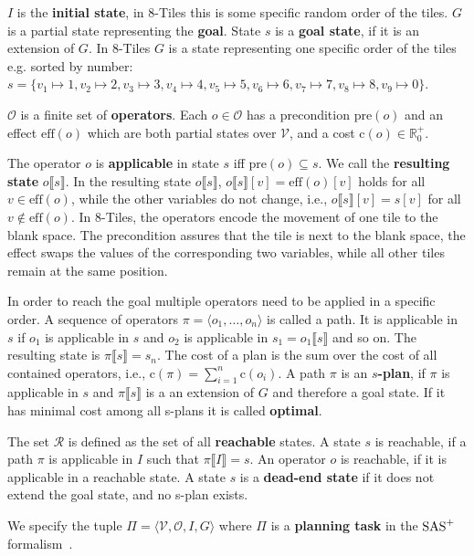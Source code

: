 $I$ is the \textbf{initial state}, in 8-Tiles this is some specific random order of the tiles.
$G$ is a partial state representing the \textbf{goal}.
State $s$ is a \textbf{goal state}, if it is an extension of $G$.
In 8-Tiles $G$ is a state representing one specific order of the tiles e.g. sorted by number:
$s = \{v_1\mapsto1, v_2\mapsto2, v_3\mapsto3, v_4\mapsto4, v_5\mapsto5, v_6\mapsto6, v_7\mapsto7, v_8\mapsto8, v_9\mapsto0\}$.

$\mathcal{O}$ is a finite set of \textbf{operators}.
Each $o\in\mathcal{O}$ has a precondition $\text{pre}(o)$ and an effect $\text{eff}(o)$ which are both partial states over $\mathcal{V}$, and a cost $\text{c}(o)\in\mathbb{R}^+_0$.

The operator $o$ is \textbf{applicable} in state $s$ iff $\text{pre}(o)\subseteq s$.
We call the \textbf{resulting state} $o\llbracket s\rrbracket$.
In the resulting state $o\llbracket s\rrbracket$, $o\llbracket s\rrbracket[v] = \text{eff}(o)[v]$ holds for all $v\in \text{eff}(o)$, while the other variables do not change, i.e., $o\llbracket s\rrbracket[v]=s[v]$ for all $v\notin \text{eff}(o)$.
In 8-Tiles, the operators encode the movement of one tile to the blank space.
The precondition assures that the tile is next to the blank space, the effect swaps the values of the corresponding two variables, while all other tiles remain at the same position.

In order to reach the goal multiple operators need to be applied in a specific order.
A sequence of operators $\pi=\langle o_1,\dots, o_n\rangle$ is called a path.
It is applicable in $s$ if $o_1$ is applicable in $s$ and $o_2$ is applicable in $s_1=o_1\llbracket s \rrbracket$ and so on.
The resulting state is $\pi\llbracket s\rrbracket = s_n$.
The cost of a plan is the sum over the cost of all contained operators, i.e., $\text{c}(\pi) = \sum_{i=1}^n{\text{c}(o_i)}$.
A path $\pi$ is an \textbf{$s$-plan}, if $\pi$ is applicable in $s$ and $\pi\llbracket s\rrbracket$ is a an extension of $G$ and therefore a goal state.
If it has minimal cost among all s-plans it is called \textbf{optimal}.

The set $\mathcal{R}$ is defined as the set of all \textbf{reachable} states.
A state $s$ is reachable, if a path $\pi$ is applicable in $I$ such that $\pi\llbracket I\rrbracket = s$.
An operator $o$ is reachable, if it is applicable in a reachable state.
A state $s$ is a \textbf{dead-end state} if it does not extend the goal state, and no s-plan exists.

We specify the tuple $\Pi=\langle\mathcal{V},\mathcal{O},I,G \rangle$ where $\Pi$ is a \textbf{planning task} in the $\textup{SAS}^{+}$ formalism~\citep{backstrom1995complexity}.

